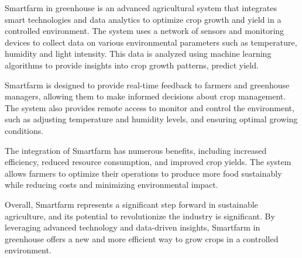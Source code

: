 \begin{abstractEn}
	
	Smartfarm in greenhouse is an advanced agricultural system that integrates smart technologies and data analytics to optimize crop growth and yield in a controlled environment. The system uses a network of sensors and monitoring devices to collect data on various environmental parameters such as temperature, humidity and light intensity. This data is analyzed using machine learning algorithms to provide insights into crop growth patterns, predict yield.

	Smartfarm  is designed to provide real-time feedback to farmers and greenhouse managers, allowing them to make informed decisions about crop management. The system also provides remote access to monitor and control the environment, such as adjusting temperature and humidity levels, and ensuring optimal growing conditions.
	
	The integration of Smartfarm  has numerous benefits, including increased efficiency, reduced resource consumption, and improved crop yields. The system allows farmers to optimize their operations to produce more food sustainably while reducing costs and minimizing environmental impact.
	
	Overall, Smartfarm  represents a significant step forward in sustainable agriculture, and its potential to revolutionize the industry is significant. By leveraging advanced technology and data-driven insights, Smartfarm in greenhouse offers a new and more efficient way to grow crops in a controlled environment.
	
\end{abstractEn}

